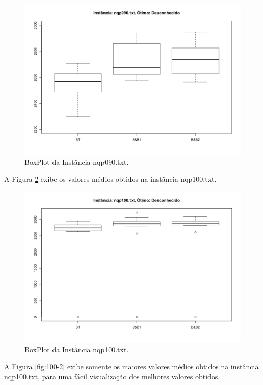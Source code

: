 \documentclass[12pt]{article}
\begin{document}
	\begin{figure}[H]
		\centering
		\includegraphics[width=0.9\linewidth]{img/90}
		\caption{BoxPlot da Instância nqp090.txt.}
		\label{fig:90}
	\end{figure}

	A Figura \ref{fig:100} exibe os valores médios obtidos na instância nqp100.txt.

	\begin{figure}[H]
		\centering
		\includegraphics[width=0.9\linewidth]{img/100}
		\caption{BoxPlot da Instância nqp100.txt.}
		\label{fig:100}
	\end{figure}

	A Figura \ref{fig:100-2} exibe somente os maiores valores médios obtidos na instância nqp100.txt, para uma fácil visualização dos melhores valores obtidos.
\end{document}
